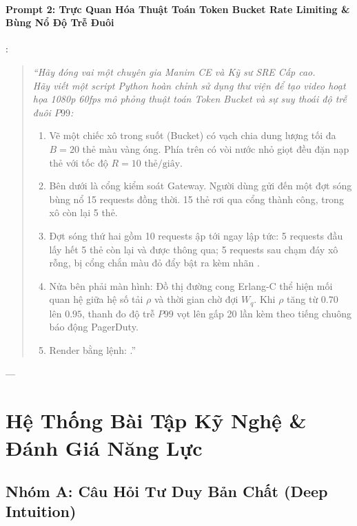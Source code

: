\begin{simulationbox}
\paragraph{Prompt 2: Trực Quan Hóa Thuật Toán Token Bucket Rate Limiting \& Bùng Nổ Độ Trễ Đuôi}:
\begin{quote}
\small\itshape
``Hãy đóng vai một chuyên gia Manim CE và Kỹ sư SRE Cấp cao. \\
Hãy viết một script Python hoàn chỉnh sử dụng thư viện  để tạo video hoạt họa 1080p 60fps mô phỏng thuật toán Token Bucket và sự suy thoái độ trễ đuôi $P99$:
\begin{enumerate}
  \item Vẽ một chiếc xô trong suốt (Bucket) có vạch chia dung lượng tối đa $B = 20$ thẻ màu vàng óng. Phía trên có vòi nước nhỏ giọt đều đặn nạp thẻ với tốc độ $R = 10\text{ thẻ/giây}$.
  \item Bên dưới là cổng kiểm soát Gateway. Người dùng gửi đến một đợt sóng bùng nổ 15 requests đồng thời. 15 thẻ rơi qua cổng thành công, trong xô còn lại 5 thẻ.
  \item Đợt sóng thứ hai gồm 10 requests ập tới ngay lập tức: 5 requests đầu lấy hết 5 thẻ còn lại và được thông qua; 5 requests sau chạm đáy xô rỗng, bị cổng chắn màu đỏ đẩy bật ra kèm nhãn .
  \item Nửa bên phải màn hình: Đồ thị đường cong Erlang-C thể hiện mối quan hệ giữa hệ số tải $\rho$ và thời gian chờ đợi $W_q$. Khi $\rho$ tăng từ $0.70$ lên $0.95$, thanh đo độ trễ $P99$ vọt lên gấp 20 lần kèm theo tiếng chuông báo động PagerDuty.
  \item Render bằng lệnh: .''
\end{enumerate}
\end{quote}
\end{simulationbox}

---

\section{Hệ Thống Bài Tập Kỹ Nghệ \& Đánh Giá Năng Lực}
\label{sec:ch13-exercises}

\subsection{Nhóm A: Câu Hỏi Tư Duy Bản Chất (Deep Intuition)}

